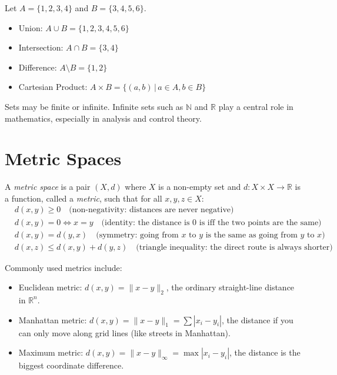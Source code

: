 \begin{example}
Let $A = \{1,2,3,4\}$ and $B = \{3,4,5,6\}$.  
\begin{itemize}
    \item Union: $A \cup B = \{1,2,3,4,5,6\}$  
    \item Intersection: $A \cap B = \{3,4\}$  
    \item Difference: $A \setminus B = \{1,2\}$  
    \item Cartesian Product: $A \times B = \{(a,b)\,|\, a \in A, b \in B\}$  
\end{itemize}
\end{example}

\begin{remark}
Sets may be finite or infinite. Infinite sets such as $\mathbb{N}$ and $\mathbb{R}$ play a central role in mathematics, especially in analysis and control theory.
\end{remark}

\section{Metric Spaces}

\begin{definition}
A \emph{metric space} is a pair $(X,d)$ where $X$ is a non-empty set and 
$d : X \times X \to \mathbb{R}$ is a function, called a \emph{metric}, such that for all $x,y,z \in X$:
\begin{align}
    & d(x,y) \geq 0 \quad \text{(non-negativity: distances are never negative)} \\
    & d(x,y) = 0 \iff x=y \quad \text{(identity: the distance is $0$ is iff the two points are the same)} \\
    & d(x,y) = d(y,x) \quad \text{(symmetry: going from $x$ to $y$ is the same as going from $y$ to $x$)} \\
    & d(x,z) \leq d(x,y) + d(y,z) \quad \text{(triangle inequality: the direct route is always shorter)}
\end{align}
\end{definition}

\begin{notation}
Commonly used metrics include:
\begin{itemize}
    \item Euclidean metric: $d(x,y) = \|x-y\|_2$, the ordinary straight-line distance in $\mathbb{R}^n$.  
    \item Manhattan metric: $d(x,y) = \|x-y\|_1 = \sum |x_i - y_i|$, the distance if you can only move along grid lines (like streets in Manhattan).  
    \item Maximum metric: $d(x,y) = \|x-y\|_\infty = \max |x_i - y_i|$, the distance is the biggest coordinate difference.  
\end{itemize}
\end{notation}

